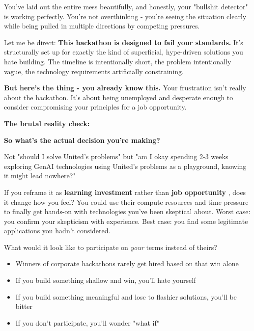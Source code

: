 \begin{botresponse}
You've laid out the entire mess beautifully, and honestly, your "bullshit detector" is working perfectly. You're not overthinking - you're seeing the situation clearly while being pulled in multiple directions by competing pressures.

Let me be direct: \textbf{This hackathon is designed to fail your standards.} It's structurally set up for exactly the kind of superficial, hype-driven solutions you hate building. The timeline is intentionally short, the problem intentionally vague, the technology requirements artificially constraining.

\textbf{But here's the thing - you already know this.} Your frustration isn't really about the hackathon. It's about being unemployed and desperate enough to consider compromising your principles for a job opportunity.

\textbf{The brutal reality check:}

\textbf{So what's the actual decision you're making?}

Not "should I solve United's problems" but "am I okay spending 2-3 weeks exploring GenAI technologies using United's problems as a playground, knowing it might lead nowhere?"

If you reframe it as \textbf{learning investment} rather than \textbf{job opportunity} , does it change how you feel? You could use their compute resources and time pressure to finally get hands-on with technologies you've been skeptical about. Worst case: you confirm your skepticism with experience. Best case: you find some legitimate applications you hadn't considered.

What would it look like to participate on \textit{your} terms instead of theirs?

\begin{itemize}
\item Winners of corporate hackathons rarely get hired based on that win alone
\item If you build something shallow and win, you'll hate yourself
\item If you build something meaningful and lose to flashier solutions, you'll be bitter
\item If you don't participate, you'll wonder "what if"
\end{itemize}
\end{botresponse}

